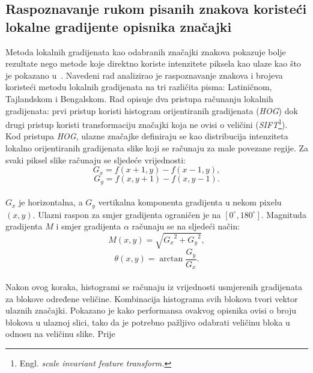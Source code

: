\subsection{Raspoznavanje rukom pisanih znakova koristeći lokalne gradijente opisnika značajki}
\label{subsec:raspoznavanje-rukom-pisanih-znakova-koristeci-lokalne-gradijente-opisnika-znacajki}
Metoda lokalnih gradijenata kao odabranih značajki znakova pokazuje bolje rezultate nego metode koje direktno koriste
intenzitete piksela kao ulaze kao što je pokazano u\ \citep{surinta2015}. Navedeni rad analizirao je raspoznavanje
znakova i brojeva koristeći metodu lokalnih gradijenata na tri različita pisma: Latiničnom, Tajlandskom i Bengalskom.
Rad opisuje dva pristupa računanju lokalnih gradijenata: prvi pristup koristi histogram orijentiranih gradijenata
(\emph{HOG}) dok drugi pristup koristi transformaciju značajki koja ne ovisi o veličini (\emph{SIFT}\footnote{
Engl. \emph{scale invariant feature transform.}}).\\
Kod pristupa \emph{HOG}, ulazne značajke definiraju se kao distribucija intenziteta lokalno orijentiranih gradijenata
slike koji se računaju za male povezane regije. Za svaki piksel slike računaju se sljedeće vrijednosti:\\
\begin{equation*}
    G_x = f(x + 1, y) - f(x - 1, y),
\end{equation*}
\begin{equation*}
    G_y = f(x, y + 1) - f(x, y - 1).
\end{equation*}
\\
$G_x$ je horizontalna, a $G_y$ vertikalna komponenta gradijenta u nekom pixelu $(x, y)$. Ulazni raspon za smjer
gradijenta ograničen je na $[0^{\circ}, 180^{\circ}]$. Magnituda gradijenta $M$ i smjer gradijenta $\alpha$ računaju se
na sljedeći način:\\
\begin{equation*}
    M(x, y) = \sqrt{{G_x}^2 + {G_y}^2},
\end{equation*}
\begin{equation*}
    \theta(x, y) = \arctan{\frac{G_y}{G_x}}.
\end{equation*}
\\
Nakon ovog koraka, histogrami se računaju iz vrijednosti usmjerenih gradijenata za blokove određene veličine.
Kombinacija histograma svih blokova tvori vektor ulaznih značajki. Pokazano je kako performansa ovakvog opisnika ovisi
o broju blokova u ulaznoj slici, tako da je potrebno pažljivo odabrati veličinu bloka u odnosu na veličinu slike. Prije
